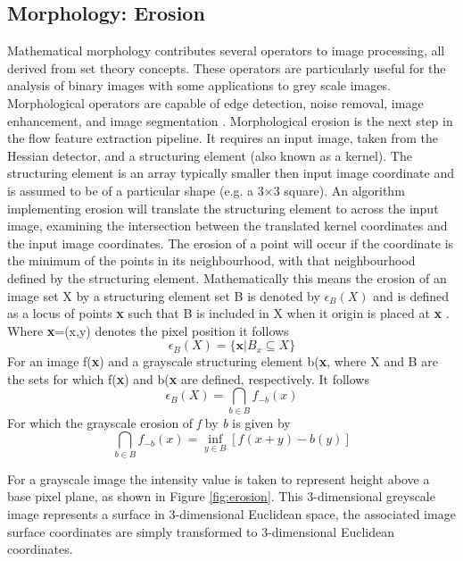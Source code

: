 \subsection{Morphology: Erosion}
Mathematical morphology contributes several operators to image processing, all derived from set theory concepts. These operators are particularly useful for the analysis of binary images with some applications to grey scale images. Morphological operators are capable of edge detection, noise removal, image enhancement, and image segmentation \citep{roushdy2006comparative}. Morphological erosion is the next step in the flow feature extraction pipeline. It requires an input image, taken from the Hessian detector, and a structuring element (also known as a kernel). The structuring element is an array typically smaller then input image coordinate and is assumed to be of a particular shape (e.g. a 3×3 square). An algorithm implementing erosion will translate the structuring element to across the input image, examining the intersection between the translated kernel coordinates and the input image coordinates. The erosion of a point will occur if the coordinate is the minimum of the points in its neighbourhood, with that neighbourhood defined by the structuring element. Mathematically this means the erosion of an image set X by a structuring element set B is denoted by $\epsilon_B(X)$ and is defined as a locus of points \textbf{x} such that B is included in X when it origin is placed at \textbf{x} \citep{soille2013morphological}. Where \textbf{x}=(x,y) denotes the pixel position it follows
\begin{equation}
\epsilon_B(X) = \{\textbf{x}|B_x \subseteq X\}
\end{equation}
For an image f(\textbf{x}) and a grayscale structuring element b(\textbf{x}, where X and B are the sets for which f(\textbf{x}) and b(\textbf{x} are defined, respectively. It follows
\begin{equation}
\epsilon_B(X) = \bigcap _{b\in B}f_{-b}(x)
\end{equation}
For which the grayscale erosion of \textit{f} by \textit{b} is given by 
\begin{equation}
\bigcap _{b\in B}f_{-b}(x)=\inf_{y\in B}[f(x+y)-b(y)]
\end{equation}

For a grayscale image the intensity value is taken to represent height above a base pixel plane, as shown in Figure \ref{fig:erosion}. This 3-dimensional greyscale image represents a surface in 3-dimensional Euclidean space, the associated image surface coordinates are simply transformed to 3-dimensional Euclidean coordinates.

